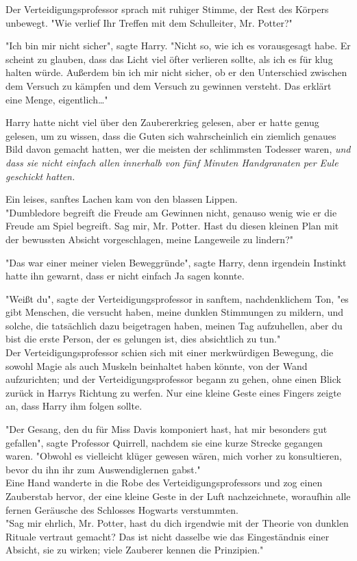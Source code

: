 {Der Verteidigungsprofessor sprach mit ruhiger Stimme, der Rest des Körpers unbewegt. "Wie verlief Ihr Treffen mit dem Schulleiter, Mr. Potter?"

"Ich bin mir nicht sicher", sagte Harry. "Nicht so, wie ich es vorausgesagt habe. Er scheint zu glauben, dass das Licht viel öfter verlieren sollte, als ich es für klug halten würde. Außerdem bin ich mir nicht sicher, ob er den Unterschied zwischen dem Versuch zu kämpfen und dem Versuch zu gewinnen versteht. Das erklärt eine Menge, eigentlich…"

Harry hatte nicht viel über den Zaubererkrieg gelesen, aber er hatte genug gelesen, um zu wissen, dass die Guten sich wahrscheinlich ein ziemlich genaues Bild davon gemacht hatten, wer die meisten der schlimmsten Todesser waren, \emph{und dass sie nicht einfach allen innerhalb von fünf Minuten Handgranaten per Eule geschickt hatten.}

Ein leises, sanftes Lachen kam von den blassen Lippen.\\ "Dumbledore begreift die Freude am Gewinnen nicht, genauso wenig wie er die Freude am Spiel begreift. Sag mir, Mr. Potter. Hast du diesen kleinen Plan mit der bewussten Absicht vorgeschlagen, meine Langeweile zu lindern?"

"Das war einer meiner vielen Beweggründe", sagte Harry, denn irgendein Instinkt hatte ihn gewarnt, dass er nicht einfach Ja sagen konnte.

"Weißt du", sagte der Verteidigungsprofessor in sanftem, nachdenklichem Ton, "es gibt Menschen, die versucht haben, meine dunklen Stimmungen zu mildern, und solche, die tatsächlich dazu beigetragen haben, meinen Tag aufzuhellen, aber du bist die erste Person, der es gelungen ist, dies absichtlich zu tun."\\ Der Verteidigungsprofessor schien sich mit einer merkwürdigen Bewegung, die sowohl Magie als auch Muskeln beinhaltet haben könnte, von der Wand aufzurichten; und der Verteidigungsprofessor begann zu gehen, ohne einen Blick zurück in Harrys Richtung zu werfen. Nur eine kleine Geste eines Fingers zeigte an, dass Harry ihm folgen sollte.

"Der Gesang, den du für Miss Davis komponiert hast, hat mir besonders gut gefallen", sagte Professor Quirrell, nachdem sie eine kurze Strecke gegangen waren. "Obwohl es vielleicht klüger gewesen wären, mich vorher zu konsultieren, bevor du ihn ihr zum Auswendiglernen gabst."\\ Eine Hand wanderte in die Robe des Verteidigungsprofessors und zog einen Zauberstab hervor, der eine kleine Geste in der Luft nachzeichnete, woraufhin alle fernen Geräusche des Schlosses Hogwarts verstummten.\\ "Sag mir ehrlich, Mr. Potter, hast du dich irgendwie mit der Theorie von dunklen Rituale vertraut gemacht? Das ist nicht dasselbe wie das Eingeständnis einer Absicht, sie zu wirken; viele Zauberer kennen die Prinzipien."

}
